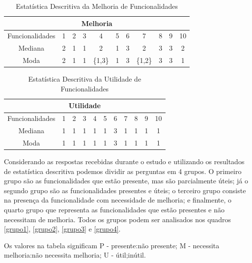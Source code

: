 \begin{table}[h]
	\centering
	\caption{Estatística Descritiva da Melhoria de Funcionalidades}
	\label{estatistica_melhoria}
	\begin{tabular}{|c|c|c|c|c|c|c|c|c|c|c|}
			\hline
			\multicolumn{11}{|c|}{Melhoria}\\
			\hline
			Funcionalidades & 1 & 2 & 3 & 4 & 5 & 6 & 7 & 8 & 9 & 10 \\
			\hline
			Mediana & 2 & 1 & 1 & 2 & 1 & 3 & 2 & 3 & 3 & 2 \\
			\hline
			Moda & 2 & 1 & 1 & \{1,3\} & 1 & 3 & \{1,2\} & 3 & 3 & 1 \\
			\hline
			
			
	\end{tabular}
\end{table}

\begin{table}[h!]
	\centering
	\caption{Estatística Descritiva da Utilidade de Funcionalidades}
	\label{estatistica_utilidade}
	\begin{tabular}{|c|c|c|c|c|c|c|c|c|c|c|}
			\hline
			\multicolumn{11}{|c|}{Utilidade}\\
			\hline
			Funcionalidades & 1 & 2 & 3 & 4 & 5 & 6 & 7 & 8 & 9 & 10 \\
			\hline
			Mediana & 1 & 1 & 1 & 1 & 1 & 3 & 1 & 1 & 1 & 1 \\
			\hline
			Moda & 1 & 1 & 1 &1 & 1 & 3 & 1 & 1 & 1 & 1 \\
			\hline
			
			
	\end{tabular}
\end{table}

Considerando as respostas recebidas durante o estudo e utilizando os resultados de estatística descritiva podemos dividir as perguntas em 4 grupos. O primeiro grupo são as funcionalidades que estão presente, mas são parcialmente úteis; já o segundo grupo são as funcionalidades presentes e úteis; o terceiro grupo consiste na presença da funcionalidade com necessidade de melhoria; e finalmente, o quarto grupo que representa as funcionalidades que estão presentes e não necessitam de melhoria. Todos os grupos podem ser analisados nos quadros \ref{grupo1}, \ref{grupo2}, \ref{grupo3} e \ref{grupo4}.

Os valores na tabela significam P - presente:não presente; M - necessita melhoria:não necessita melhoria; U - útil;inútil. 


